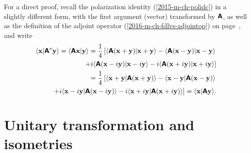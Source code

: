 {\color{OliveGreen}\bproof
For a direct proof,
recall the
polarization identity
(\ref{2015-m-ch-polidc})  in a slightly different form, with the first argument (vector) transformed by $\textsf{\textbf{A}}$,
as well as the definition of the adjoint operator (\ref{2016-m-ch-fdlvs-adjointop})
on page~\pageref{2016-m-ch-fdlvs-adjointop},
and write
\begin{equation}
\begin{split}
\langle {\bf x}\vert \textsf{\textbf{A}}^\ast {\bf y}\rangle
=
\langle \textsf{\textbf{A}} {\bf x}\vert {\bf y}\rangle
=
\frac{1}{4}\left[
\langle \textsf{\textbf{A}} ({\bf x}+ {\bf y}) \vert {\bf x}+ {\bf y}\rangle
-
\langle \textsf{\textbf{A}}({\bf x}- {\bf y}) \vert {\bf x}- {\bf y}\rangle \right.  \\
\left.
+ i
\langle \textsf{\textbf{A}} ({\bf x}- i{\bf y}) \vert {\bf x}- i{\bf y}\rangle
- i
\langle \textsf{\textbf{A}} ({\bf x}+ i{\bf y}) \vert {\bf x} +i {\bf y}\rangle
\right]
\\
=
\frac{1}{4}\left[
\langle {\bf x}+ {\bf y} \vert \textsf{\textbf{A}} ({\bf x}+ {\bf y})\rangle
-
\langle {\bf x}- {\bf y} \vert \textsf{\textbf{A}}({\bf x}- {\bf y})\rangle \right.  \\
\left.
+ i
\langle {\bf x}- i{\bf y} \vert \textsf{\textbf{A}} ({\bf x}- i{\bf y})\rangle
- i
\langle {\bf x}+ i{\bf y} \vert \textsf{\textbf{A}} ({\bf x} +i {\bf y})\rangle
\right]
=
\langle {\bf x}\vert \textsf{\textbf{A}}{\bf y}\rangle
.
\end{split}
\label{2015-m-ch-polidrv}
\end{equation}
\eproof
}




\section{Unitary transformation and isometries}
\label{2014-m-ch-fdvs-unitary}


